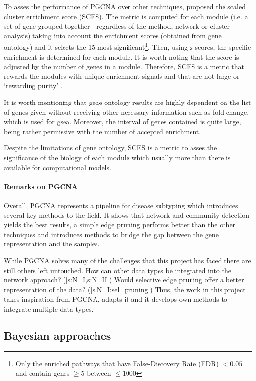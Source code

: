 To asses the performance of PGCNA over other techniques, \citet{Care2019-ij} proposed the scaled cluster enrichment score (SCES). The metric is computed for each module (i.e. a set of gene grouped together - regardless of the method, network or cluster analysis) taking into account the enrichment scores (obtained from gene ontology) and it selects the 15 most significant\footnote{Only the enriched pathways that have False-Discovery Rate (FDR) $<0.05$ and contain genes $\geq5$ between $\leq1000$}. Then, using z-scores, the specific enrichment is determined for each module. It is worth noting that the score is adjusted by the number of genes in a module. Therefore, SCES is a metric that rewards the modules with unique enrichment signals and that are not large or ‘rewarding purity' \citep{Care2019-ij}.

It is worth mentioning that gene ontology results are highly dependent on the list of genes given without receiving other necessary information such as fold change, which is used for \acrlong{gsea}. Moreover, the interval of genes contained is quite large, being rather permissive with the number of accepted enrichment.

Despite the limitations of gene ontology, SCES is a metric to asses the significance of the biology of each module which usually more than there is available for computational models.


\paragraph*{Remarks on PGCNA}

Overall, PGCNA represents a pipeline for disease subtyping which introduces several key methods to the field. It shows that network and community detection yields the best results, a simple edge pruning performs better than the other techniques and introduces methods to bridge the gap between the gene representation and the samples.

While PGCNA solves many of the challenges that this project has faced there are still others left untouched. How can other data types be integrated into the network approach? (\cref{s:N_I,s:N_II}) Would selective edge pruning offer a better representation of the data? (\cref{s:N_I:sel_pruning}) Thus, the work in this project takes inspiration from PGCNA, adapts it and it develops own methods to integrate multiple data types.

\subsection{Bayesian approaches} \label{s:lit:bayesian}

